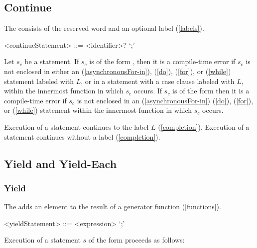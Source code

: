 \documentclass[makeidx]{article}
\begin{document}
{\subsection{Continue}

\LMHash{}%
The  consists of the reserved word \CONTINUE{} and an optional label (\ref{labels}).

\begin{grammar}
<continueStatement> ::= \CONTINUE{} <identifier>? `;'
\end{grammar}

\LMHash{}%
Let $s_c$ be a \CONTINUE{} statement.
If $s_c$ is of the form ,
then it is a compile-time error if $s_c$ is not enclosed in either an
\code{\AWAIT{} \FOR{}} (\ref{asynchronousFor-in}),
\DO{} (\ref{do}), \FOR{} (\ref{for}), or \WHILE{} (\ref{while})
statement labeled with $L$, or in a \SWITCH{} statement with a case clause
labeled with $L$, within the innermost function in which $s_c$ occurs.
If $s_c$ is of the form \code{\CONTINUE{};}
then it is a compile-time error if $s_c$ is not enclosed in an
\code{\AWAIT{} \FOR{}} (\ref{asynchronousFor-in})
\DO{} (\ref{do}), \FOR{} (\ref{for}), or \WHILE{} (\ref{while}) statement
within the innermost function in which $s_c$ occurs.

\LMHash{}%
Execution of a \CONTINUE{} statement  continues to the label $L$ (\ref{completion}).
Execution of a \CONTINUE{} statement \code{\CONTINUE{};} continues without a label (\ref{completion}).


\subsection{Yield and Yield-Each}


\subsubsection{Yield}

\LMHash{}%
The  adds an element to the result of a generator function (\ref{functions}).

\begin{grammar}
<yieldStatement> ::= \YIELD{} <expression> `;'
\end{grammar}

\LMHash{}%
Execution of a statement $s$ of the form  proceeds as follows:

}
\end{document}
